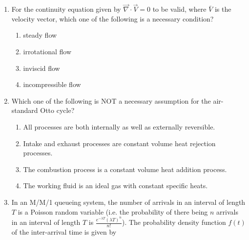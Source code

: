 \documentclass[journal,12pt,onecolumn]{IEEEtran}
\begin{document}
\begin{enumerate}
    \item For the continuity equation given by $\overrightarrow{\nabla}\cdot\overrightarrow{V} = 0$ to be valid, where $\bar{V}$ is the velocity vector, which one of the following is a necessary condition?\\

          \begin{enumerate}
              \item steady flow
              \item irrotational flow
              \item inviscid flow
              \item incompressible flow
          \end{enumerate}

    \item Which one of the following is NOT a necessary assumption for the air-standard Otto cycle?\\

          \begin{enumerate}
              \item All processes are both internally as well as externally reversible.
              \item Intake and exhaust processes are constant volume heat rejection processes.
              \item The combustion process is a constant volume heat addition process.
              \item The working fluid is an ideal gas with constant specific heats.
          \end{enumerate}

    \item In an M/M/1 queueing system, the number of arrivals in an interval of length $T$ is a Poisson random variable (i.e. the probability of there being $n$ arrivals in an interval of length $T$ is $\frac{e^{-\lambda T}(\lambda T)^n}{n!}$). The probability density function $f(t)$ of the inter-arrival time is given by\\

          \begin{enumerate}
          \end{enumerate}


\end{enumerate}
\end{document}
